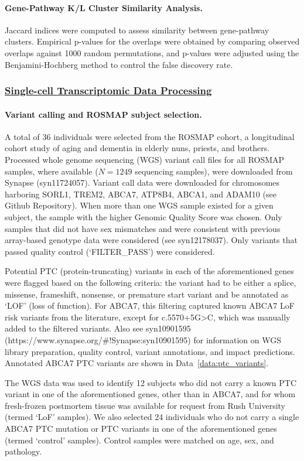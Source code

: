 \documentclass[12pt]{article}
\begin{document}
\paragraph{Gene-Pathway K/L Cluster Similarity Analysis.}
Jaccard indices were computed to assess similarity between gene-pathway clusters. Empirical p-values for the overlaps were obtained by comparing observed overlaps against 1000 random permutations, and p-values were adjusted using the Benjamini-Hochberg method to control the false discovery rate. \subsubsection{\underline{Single-cell Transcriptomic Data Processing}}

\paragraph{Variant calling and ROSMAP subject selection.}
A total of 36 individuals were selected from the ROSMAP cohort, a longitudinal cohort study of aging and dementia in elderly nuns, priests, and brothers. Processed whole genome sequencing (WGS) variant call files for all ROSMAP samples, where available ($N=1249$ sequencing samples), were downloaded from Synapse (syn11724057). Variant call data were downloaded for chromosomes harboring SORL1, TREM2, ABCA7, ATP8B4, ABCA1, and ADAM10 (see Github Repository). When more than one WGS sample existed for a given subject, the sample with the higher Genomic Quality Score was chosen. Only samples that did not have sex mismatches and were consistent with previous array-based genotype data were considered (see syn12178037). Only variants that passed quality control (‘FILTER_PASS’) were considered.

Potential PTC (protein-truncating) variants in each of the aforementioned genes were flagged based on the following criteria: the variant had to be either a splice, missense, frameshift, nonsense, or premature start variant and be annotated as ‘LOF’ (loss of function). For ABCA7, this filtering captured known ABCA7 LoF risk variants from the literature, except for c.5570+5G>C, which was manually added to the filtered variants. Also see syn10901595 (https://www.synapse.org/\#!Synapse:syn10901595) for information on WGS library preparation, quality control, variant annotations, and impact predictions. Annotated ABCA7 PTC variants are shown in Data~\ref{data:ptc_variants}.

The WGS data was used to identify 12 subjects who did not carry a known PTC variant in one of the aforementioned genes, other than in ABCA7, and for whom fresh-frozen postmortem tissue was available for request from Rush University (termed ‘LoF’ samples). We also selected 24 individuals who do not carry a single ABCA7 PTC mutation or PTC variants in one of the aforementioned genes (termed ‘control’ samples). Control samples were matched on age, sex, and pathology. 
\end{document}
